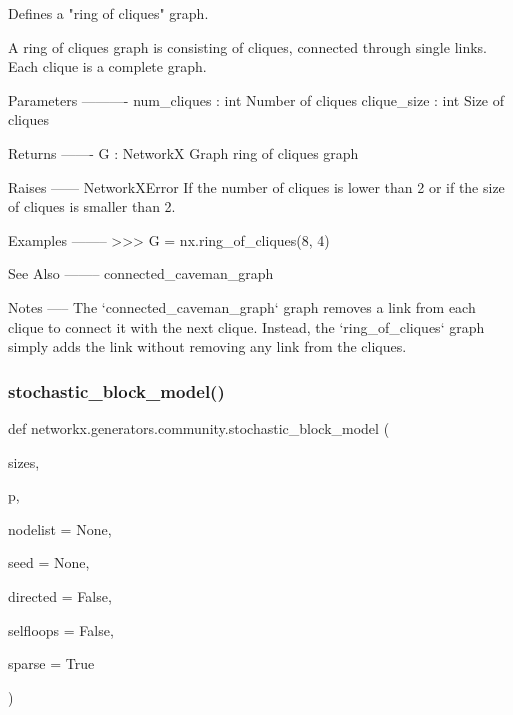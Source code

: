 \begin{DoxyVerb}Defines a "ring of cliques" graph.

A ring of cliques graph is consisting of cliques, connected through single
links. Each clique is a complete graph.

Parameters
----------
num_cliques : int
    Number of cliques
clique_size : int
    Size of cliques

Returns
-------
G : NetworkX Graph
    ring of cliques graph

Raises
------
NetworkXError
    If the number of cliques is lower than 2 or
    if the size of cliques is smaller than 2.

Examples
--------
>>> G = nx.ring_of_cliques(8, 4)

See Also
--------
connected_caveman_graph

Notes
-----
The `connected_caveman_graph` graph removes a link from each clique to
connect it with the next clique. Instead, the `ring_of_cliques` graph
simply adds the link without removing any link from the cliques.
\end{DoxyVerb}
 \mbox{\label{namespacenetworkx_1_1generators_1_1community_a4093ce10a6704e73cc39103ffcefb13b}} 
\subsubsection{\texorpdfstring{stochastic\+\_\+block\+\_\+model()}{stochastic\_block\_model()}}
{\footnotesize\ttfamily def networkx.\+generators.\+community.\+stochastic\+\_\+block\+\_\+model (\begin{DoxyParamCaption}\item[{}]{sizes,  }\item[{}]{p,  }\item[{}]{nodelist = {\ttfamily None},  }\item[{}]{seed = {\ttfamily None},  }\item[{}]{directed = {\ttfamily False},  }\item[{}]{selfloops = {\ttfamily False},  }\item[{}]{sparse = {\ttfamily True} }\end{DoxyParamCaption})}

